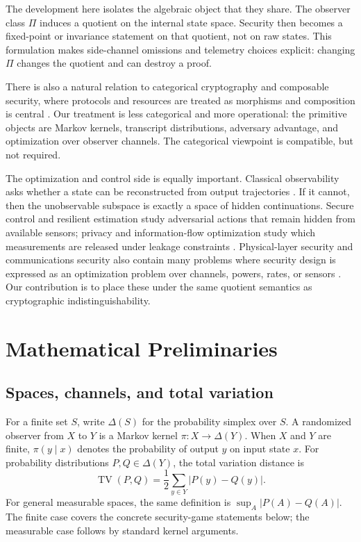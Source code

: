 \documentclass[11pt]{article}
\theoremstyle{definition}
\theoremstyle{plain}
\theoremstyle{remark}
\DeclareMathOperator{\TV}{TV}
\newcommand{\DeltaS}{\Delta}
\begin{document}
The development here isolates the algebraic object that they share. The observer class $\Pi$ induces a quotient on the internal state space. Security then becomes a fixed-point or invariance statement on that quotient, not on raw states. This formulation makes side-channel omissions and telemetry choices explicit: changing $\Pi$ changes the quotient and can destroy a proof.

There is also a natural relation to categorical cryptography and composable security, where protocols and resources are treated as morphisms and composition is central \cite{BroadbentKarvonen2022}. Our treatment is less categorical and more operational: the primitive objects are Markov kernels, transcript distributions, adversary advantage, and optimization over observer channels. The categorical viewpoint is compatible, but not required.

The optimization and control side is equally important. Classical observability asks whether a state can be reconstructed from output trajectories \cite{Kalman1960,Sontag1998}. If it cannot, then the unobservable subspace is exactly a space of hidden continuations. Secure control and resilient estimation study adversarial actions that remain hidden from available sensors; privacy and information-flow optimization study which measurements are released under leakage constraints \cite{CoverThomas2006,Alvim2014}. Physical-layer security and communications security also contain many problems where security design is expressed as an optimization problem over channels, powers, rates, or sensors \cite{WangBaiZhaoHan2019}. Our contribution is to place these under the same quotient semantics as cryptographic indistinguishability.

\section{Mathematical Preliminaries}

\subsection{Spaces, channels, and total variation}

For a finite set $S$, write $\DeltaS(S)$ for the probability simplex over $S$. A randomized observer from $X$ to $Y$ is a Markov kernel $\pi:X\to \DeltaS(Y)$. When $X$ and $Y$ are finite, $\pi(y\mid x)$ denotes the probability of output $y$ on input state $x$. For probability distributions $P,Q\in\DeltaS(Y)$, the total variation distance is
\[
\TV(P,Q)=\frac12\sum_{y\in Y}|P(y)-Q(y)|.
\]
For general measurable spaces, the same definition is $\sup_{A}|P(A)-Q(A)|$. The finite case covers the concrete security-game statements below; the measurable case follows by standard kernel arguments.
\end{document}
